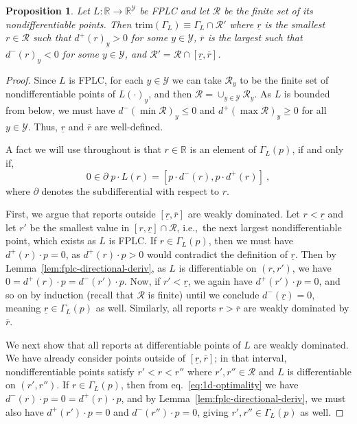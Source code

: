 \documentclass[11pt]{article}
\newcommand{\reals}{\mathbb{R}}
\newcommand{\R}{\mathcal{R}}
\newcommand{\Y}{\mathcal{Y}}
\newcommand{\trim}{\mathrm{trim}}
\newtheorem{proposition}{Proposition}
\begin{document}
\begin{proposition}\label{prop:fplc-trim-char}
  Let $L : \reals \to \reals^\Y$ be FPLC and let $\R$ be the finite set of its nondifferentiable points.
  Then $\trim(\Gamma_L) \equiv \Gamma_L\cap\R'$ where $\underline r$ is the smallest $r\in\R$ such that $d^+(r)_y > 0$ for some $y\in\Y$, $\overline r$ is the largest such that $d^-(r)_y < 0$ for some $y\in\Y$, and $\R' = \R \cap [\underline r, \overline r]$.
\end{proposition}
\begin{proof}
  Since $L$ is FPLC, for each $y\in\Y$ we can take $\R_y$ to be the finite set of nondifferentiable points of $L(\cdot)_y$, and then $\R = \cup_{y\in\Y} \R_y$.
  As $L$ is bounded from below, we must have $d^-(\min \R)_y \leq 0$ and $d^+(\max \R)_y \geq 0$ for all $y\in\Y$.
  Thus, $\underline r$ and $\overline r$ are well-defined.

  A fact we will use throughout is that $r\in\reals$ is an element of $\Gamma_L(p)$, if and only if,
  \begin{equation}
    \label{eq:1d-optimality}
    0 \in \partial \; p \cdot L(r) = [p \cdot d^-(r), p \cdot d^+(r)]~,
  \end{equation}
  where $\partial$ denotes the subdifferential with respect to $r$.

  First, we argue that reports outside $[\underline r, \overline r]$ are weakly dominated.
  Let $r < \underline r$ and let $r'$ be the smallest value in $[r,\underline r]\cap \R$, i.e.,\ the next largest nondifferentiable point, which exists as $L$ is FPLC.
  If $r \in \Gamma_L(p)$, then we must have $d^+(r)\cdot p = 0$, as $d^+(r)\cdot p > 0$ would contradict the definition of $\underline r$.
  Then by Lemma~\ref{lem:fplc-directional-deriv}, as $L$ is differentiable on $(r,r')$, we have $0 = d^+(r)\cdot p = d^-(r')\cdot p$.
  Now, if $r' < \underline r$, we again have $d^+(r')\cdot p = 0$, and so on by induction (recall that $\R$ is finite) until we conclude $d^-(\underline r) = 0$, meaning $\underline r \in \Gamma_L(p)$ as well.
  Similarly, all reports $r > \overline r$ are weakly dominated by $\overline r$.

  We next show that all reports at differentiable points of $L$ are weakly dominated.
  We have already consider points outside of $[\underline r, \overline r]$; in that interval, nondifferentiable points satisfy $r' < r < r''$ where $r',r''\in\R$ and $L$ is differentiable on $(r',r'')$.
  If $r\in\Gamma_L(p)$, then from eq.~\eqref{eq:1d-optimality} we have $d^-(r)\cdot p = 0 = d^+(r) \cdot p$, and by Lemma~\ref{lem:fplc-directional-deriv}, we must also have $d^+(r')\cdot p = 0$ and $d^-(r'')\cdot p = 0$, giving $r',r'' \in \Gamma_L(p)$ as well.


\end{proof}
\end{document}
